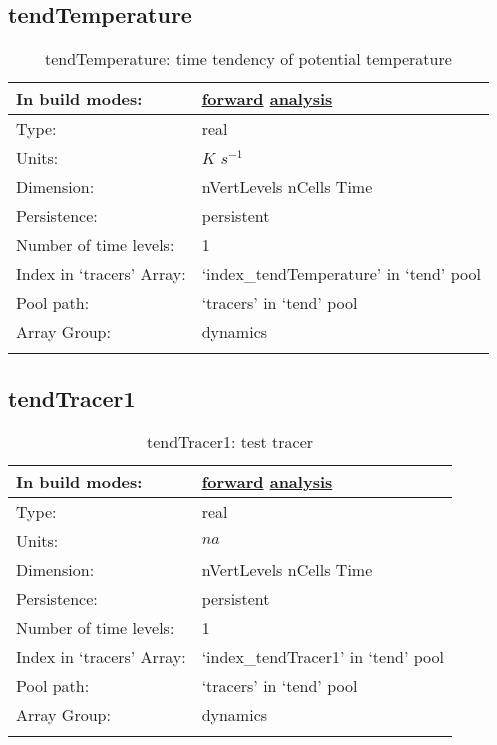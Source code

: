\subsection[tendTemperature]{tendTemperature}
\label{subsec:var_sec_tend_tendTemperature}
\begin{center}
\begin{longtable}{| p{2.0in} | p{4.0in} |}
        \hline 
        In build modes: & \hyperref[subsec:forward_var_tab_tend]{forward} \hyperref[subsec:analysis_var_tab_tend]{analysis} \\
        \hline 
        Type: & real \\
        \hline 
        Units: & $K$ $s^{-1}$ \\
        \hline 
        Dimension: & nVertLevels nCells Time \\
        \hline 
        Persistence: & persistent \\
        \hline 
        Number of time levels: & 1 \\
        \hline 
		 Index in `tracers' Array: & `index\_tendTemperature' in `tend' pool \\
		 \hline 
            Pool path: & `tracers' in `tend' pool \\
		 \hline 
		 Array Group: & dynamics \\
		 \hline 
    \caption{tendTemperature: time tendency of potential temperature}
\end{longtable}
\end{center}
\subsection[tendTracer1]{tendTracer1}
\label{subsec:var_sec_tend_tendTracer1}
\begin{center}
\begin{longtable}{| p{2.0in} | p{4.0in} |}
        \hline 
        In build modes: & \hyperref[subsec:forward_var_tab_tend]{forward} \hyperref[subsec:analysis_var_tab_tend]{analysis} \\
        \hline 
        Type: & real \\
        \hline 
        Units: & $na$ \\
        \hline 
        Dimension: & nVertLevels nCells Time \\
        \hline 
        Persistence: & persistent \\
        \hline 
        Number of time levels: & 1 \\
        \hline 
		 Index in `tracers' Array: & `index\_tendTracer1' in `tend' pool \\
		 \hline 
            Pool path: & `tracers' in `tend' pool \\
		 \hline 
		 Array Group: & dynamics \\
		 \hline 
    \caption{tendTracer1: test tracer}
\end{longtable}
\end{center}
